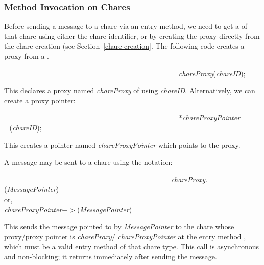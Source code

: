 \subsubsection{Method Invocation on Chares}

Before sending a message to a chare via an
entry method, we need to get a  of
that chare using either the chare identifier, or by creating the
proxy directly from the chare creation (see Section~\ref{chare
creation}. The following code creates a proxy from a .

\begin{tabbing} ~~~~ \=~~~~ \=~~~~ \=~~~~ \=~~~~ \=~~~~ \=~~~~ \=~~~~ \=~~~~
\=~~~~ \kill \> \_ {\it chareProxy}({\it chareID});
\end{tabbing}

This declares a proxy named {\it chareProxy} of  using {\it
chareID}.  Alternatively, we can create a proxy pointer:

\begin{tabbing} ~~~~ \=~~~~ \=~~~~ \=~~~~ \=~~~~ \=~~~~ \=~~~~ \=~~~~ \=~~~~
\=~~~~ \kill \> \_ *{\it chareProxyPointer} = \_({\it chareID}); \end{tabbing}

This creates a pointer named {\it chareProxyPointer} which points to the proxy. 

A message  may be sent to a chare using the
notation:

\begin{tabbing} ~~~~ \=~~~~ \=~~~~ \=~~~~ \=~~~~ \=~~~~ \=~~~~ \=~~~~ \=~~~~
\=~~~~ \kill \> {\it chareProxy}$.$({\it MessagePointer}) \\ \>
\> or, \\ \> {\it chareProxyPointer}$->$({\it MessagePointer})
\end{tabbing}

This sends the message pointed to by {\it MessagePointer} to the
chare whose proxy/proxy pointer is {\it chareProxy}/{\it
chareProxyPointer} at the entry method ,
which must be a valid entry method of that chare type. This call
is asynchronous and non-blocking; it returns immediately after sending the
message. 
